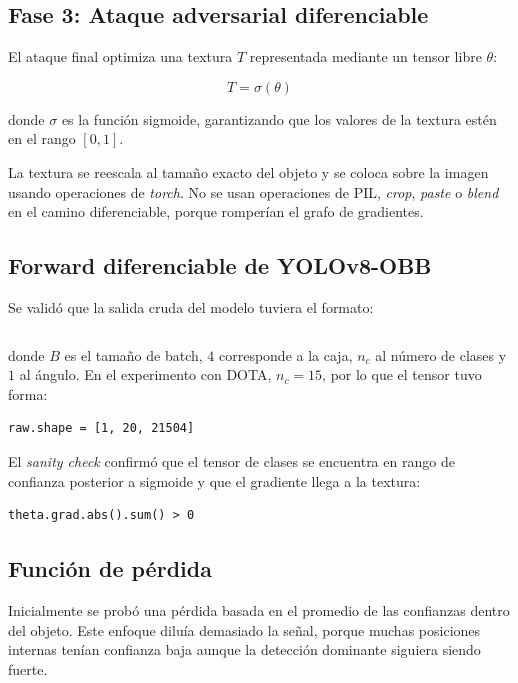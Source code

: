 \documentclass[12pt,a4paper]{article}
\begin{document}
\subsection{Fase 3: Ataque adversarial diferenciable}

El ataque final optimiza una textura $T$ representada mediante un tensor libre $\theta$:

\begin{equation}
T = \sigma(\theta)
\end{equation}

donde $\sigma$ es la función sigmoide, garantizando que los valores de la textura estén en el rango $[0,1]$.

La textura se reescala al tamaño exacto del objeto y se coloca sobre la imagen usando operaciones de \textit{torch}. No se usan operaciones de PIL, \textit{crop}, \textit{paste} o \textit{blend} en el camino diferenciable, porque romperían el grafo de gradientes.

\subsection{Forward diferenciable de YOLOv8-OBB}

Se validó que la salida cruda del modelo tuviera el formato:

\begin{equation}
[B, 4 + n_c + 1, A]
\end{equation}

donde $B$ es el tamaño de batch, $4$ corresponde a la caja, $n_c$ al número de clases y $1$ al ángulo. En el experimento con DOTA, $n_c=15$, por lo que el tensor tuvo forma:

\begin{verbatim}
raw.shape = [1, 20, 21504]
\end{verbatim}

El \textit{sanity check} confirmó que el tensor de clases se encuentra en rango de confianza posterior a sigmoide y que el gradiente llega a la textura:

\begin{verbatim}
theta.grad.abs().sum() > 0
\end{verbatim}

\subsection{Función de pérdida}

Inicialmente se probó una pérdida basada en el promedio de las confianzas dentro del objeto. Este enfoque diluía demasiado la señal, porque muchas posiciones internas tenían confianza baja aunque la detección dominante siguiera siendo fuerte.
\end{document}
